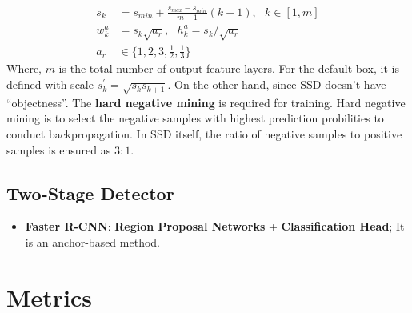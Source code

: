 \documentclass[a4paper]{article}
\begin{document}
\begin{itemize}
	\begin{align}
		s_k &= s_{min} + \frac{s_{max} - s_{min}}{m -1}(k - 1),\,\,\,\, k \in [1, m] \\
		w_k^a &= s_k \sqrt{a_r},\,\,\,\, h_k^a = s_k / \sqrt{a_r} \\
		a_r &\in \{ 1, 2, 3, \frac{1}{2}, \frac{1}{3} \}
	\end{align}
	Where, $m$ is the total number of output feature layers. For the default box, it is defined with scale $s_k^{\prime} = \sqrt{s_k s_{k+1}}$.
	On the other hand, since SSD doesn't have ``objectness''. The \textbf{hard negative mining} is required for training. Hard negative mining is to select the negative samples with highest prediction probilities to conduct backpropagation. In SSD itself, the ratio of negative samples to positive samples is ensured as $3:1$.
\end{itemize}

\subsection{Two-Stage Detector}

\begin{itemize}
	\item \textbf{Faster R-CNN}: \textbf{Region Proposal Networks} + \textbf{Classification Head}; It is an anchor-based method.
\end{itemize}

\section{Metrics}
\end{document}
